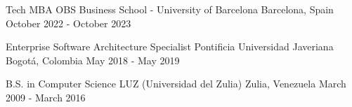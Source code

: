 \begin{cventries}

    \cventry
    {Tech MBA}
    {OBS Business School - University of Barcelona}
    {Barcelona, Spain}
    {October 2022 - October 2023}
    {}

    \cventry
	{Enterprise Software Architecture Specialist}
	{Pontificia Universidad Javeriana}
	{Bogotá, Colombia}
	{May 2018 - May 2019}
	{}
	
	
  \cventry
    {B.S. in Computer Science}
    {LUZ (Universidad del Zulia)}
    {Zulia, Venezuela}
    {March 2009 - March 2016}
    {}
\end{cventries}
